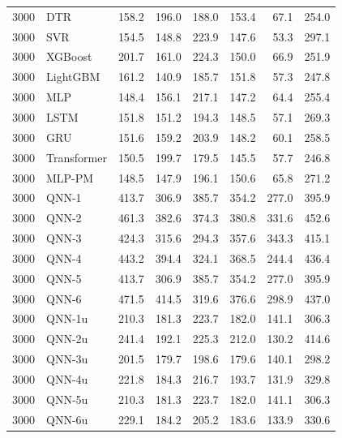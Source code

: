 \begin{longtable}{rlrrrrrr}
3000 & DTR & 158.2 & 196.0 & 188.0 & 153.4 & 67.1 & 254.0 \\
3000 & SVR & 154.5 & 148.8 & 223.9 & 147.6 & 53.3 & 297.1 \\
3000 & XGBoost & 201.7 & 161.0 & 224.3 & 150.0 & 66.9 & 251.9 \\
3000 & LightGBM & 161.2 & 140.9 & 185.7 & 151.8 & 57.3 & 247.8 \\
3000 & MLP & 148.4 & 156.1 & 217.1 & 147.2 & 64.4 & 255.4 \\
3000 & LSTM & 151.8 & 151.2 & 194.3 & 148.5 & 57.1 & 269.3 \\
3000 & GRU & 151.6 & 159.2 & 203.9 & 148.2 & 60.1 & 258.5 \\
3000 & Transformer & 150.5 & 199.7 & 179.5 & 145.5 & 57.7 & 246.8 \\
3000 & MLP-PM & 148.5 & 147.9 & 196.1 & 150.6 & 65.8 & 271.2 \\
3000 & QNN-1 & 413.7 & 306.9 & 385.7 & 354.2 & 277.0 & 395.9 \\
3000 & QNN-2 & 461.3 & 382.6 & 374.3 & 380.8 & 331.6 & 452.6 \\
3000 & QNN-3 & 424.3 & 315.6 & 294.3 & 357.6 & 343.3 & 415.1 \\
3000 & QNN-4 & 443.2 & 394.4 & 324.1 & 368.5 & 244.4 & 436.4 \\
3000 & QNN-5 & 413.7 & 306.9 & 385.7 & 354.2 & 277.0 & 395.9 \\
3000 & QNN-6 & 471.5 & 414.5 & 319.6 & 376.6 & 298.9 & 437.0 \\
3000 & QNN-1u & 210.3 & 181.3 & 223.7 & 182.0 & 141.1 & 306.3 \\
3000 & QNN-2u & 241.4 & 192.1 & 225.3 & 212.0 & 130.2 & 414.6 \\
3000 & QNN-3u & 201.5 & 179.7 & 198.6 & 179.6 & 140.1 & 298.2 \\
3000 & QNN-4u & 221.8 & 184.3 & 216.7 & 193.7 & 131.9 & 329.8 \\
3000 & QNN-5u & 210.3 & 181.3 & 223.7 & 182.0 & 141.1 & 306.3 \\
3000 & QNN-6u & 229.1 & 184.2 & 205.2 & 183.6 & 133.9 & 330.6 \\
\end{longtable}
\par{}
